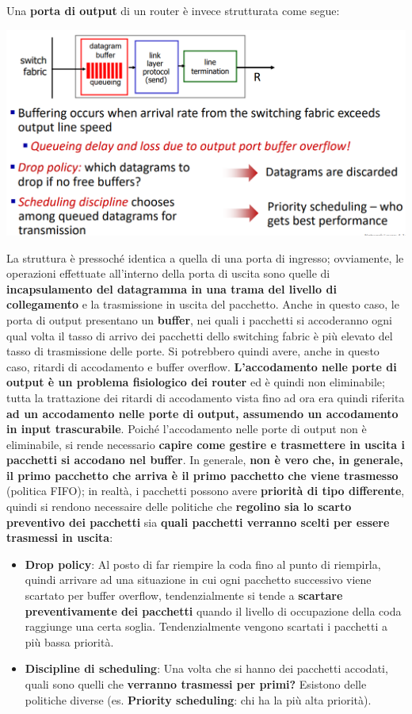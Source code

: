 \documentclass[12pt]{article}
\begin{document}
Una \textbf{porta di output} di un router è invece strutturata come segue:
\begin{center}
    \includegraphics[width = 0.901\linewidth]{Images/81.png}
\end{center}
La struttura è pressoché identica a quella di una porta di ingresso; ovviamente, le operazioni effettuate all'interno della porta di uscita sono quelle di \textbf{incapsulamento del datagramma in una trama del livello di collegamento} e la
trasmissione in uscita del pacchetto. Anche in questo caso, le porta di output presentano un \textbf{buffer}, nei quali i pacchetti si accoderanno ogni qual volta il tasso di arrivo dei pacchetti dello switching fabric è più elevato del tasso di trasmissione
delle porte. Si potrebbero quindi avere, anche in questo caso, ritardi di accodamento e buffer overflow. \textbf{L'accodamento nelle porte di output è un problema fisiologico dei router} ed è quindi non eliminabile; tutta la trattazione dei ritardi di accodamento
vista fino ad ora era quindi riferita \textbf{ad un accodamento nelle porte di output, assumendo un accodamento in input trascurabile}.
Poiché l'accodamento nelle porte di output non è eliminabile, si rende necessario \textbf{capire come gestire e trasmettere in uscita i pacchetti si accodano nel buffer}.
In generale, \textbf{non è vero che, in generale, il primo pacchetto che arriva è il primo pacchetto che viene trasmesso} (politica FIFO); in realtà, i pacchetti possono avere \textbf{priorità di tipo differente}, quindi 
si rendono necessaire delle politiche che \textbf{regolino sia lo scarto preventivo dei pacchetti} sia \textbf{quali pacchetti verranno scelti per essere trasmessi in uscita}:
\begin{itemize}
    \item \textbf{Drop policy}: Al posto di far riempire la coda fino al punto di riempirla, quindi arrivare ad una situazione in cui ogni pacchetto successivo viene scartato per buffer overflow, tendenzialmente si tende a \textbf{scartare preventivamente dei pacchetti} quando il livello di occupazione della coda raggiunge una certa soglia.
    Tendenzialmente vengono scartati i pacchetti a più bassa priorità.
    \item \textbf{Discipline di scheduling}: Una volta che si hanno dei pacchetti accodati, quali sono quelli che \textbf{verranno trasmessi per primi?} Esistono delle politiche diverse (es. \textbf{Priority scheduling}: chi ha la più alta priorità).  
\end{itemize}
\end{document}
